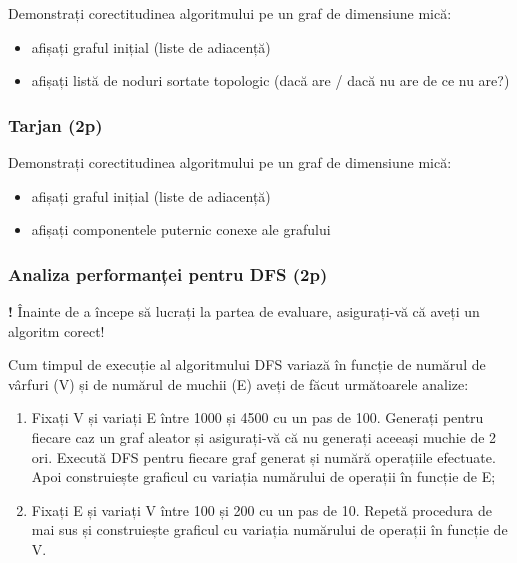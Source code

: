 \documentclass[../ro-fa-lab.tex]{subfiles}
\begin{document}
Demonstrați corectitudinea algoritmului pe un graf de dimensiune mică:

\begin{itemize}
\item
  afișați graful inițial (liste de adiacență)
\item
  afișați listă de noduri sortate topologic (dacă are / dacă nu are de
  ce nu are?)
\end{itemize}

\subsubsection{Tarjan (2p)}\label{tarjan-2p}

Demonstrați corectitudinea algoritmului pe un graf de dimensiune mică:

\begin{itemize}
\item
  afișați graful inițial (liste de adiacență)
\item
  afișați componentele puternic conexe ale grafului
\end{itemize}

\subsubsection{Analiza performanței pentru DFS
(2p)}\label{analiza-performanux21bei-pentru-dfs-2p}

\textbf{!} Înainte de a începe să lucrați la partea de evaluare,
asigurați-vă că aveți un algoritm corect!

Cum timpul de execuție al algoritmului DFS variază în funcție de numărul
de vârfuri (\textbar V\textbar) și de numărul de muchii
(\textbar E\textbar) aveți de făcut următoarele analize:

\begin{enumerate}
\def\labelenumi{\arabic{enumi}.}
\item
  Fixați \textbar V și variați \textbar E\textbar{} între
  1000 și 4500 cu un pas de 100. Generați pentru fiecare caz un graf
  aleator și asigurați-vă că nu generați aceeași muchie de 2 ori.
  Execută DFS pentru fiecare graf generat și numără operațiile
  efectuate. Apoi construiește graficul cu variația numărului de
  operații în funcție de \textbar E\textbar;
\item
  Fixați \textbar E și variați \textbar V\textbar{} între
  100 și 200 cu un pas de 10. Repetă procedura de mai sus și
  construiește graficul cu variația numărului de operații în funcție de
  \textbar V\textbar.
\end{enumerate}
\end{document}
